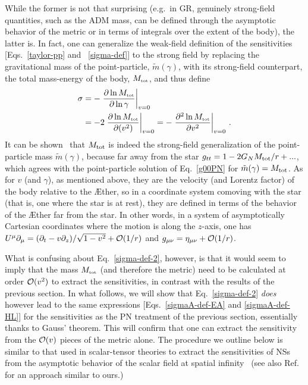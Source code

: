 \documentclass[prd,aps,twocolumn,nofootinbib,showpacs,superscriptaddress]{revtex4-1}
\newcommand{\nn}{\nonumber}
\newcommand{\tot}{{\mbox{\tiny tot}}}
\begin{document}
While the former is not that surprising (e.g.~in GR, genuinely strong-field quantities, such as
the ADM mass, can be defined through the asymptotic behavior of the metric or in terms of 
integrals over the extent of the body), the latter is. In fact, 
one can generalize the weak-field definition of the sensitivities 
[Eqs.~\eqref{taylor-pp} and ~\eqref{sigma-def}]
to the strong field by replacing the gravitational mass of the point-particle, $\tilde{m}(\gamma)$, with its strong-field counterpart, the 
total mass-energy of the body, $M_{\tot}$, and thus define
%
\begin{align}\label{sigma-def-2}
\sigma &=- \left.\frac{\partial \ln M_{\tot}}{\partial \ln
  \gamma}\right|_{v=0}\nn \\&=- 2 \left.\frac{\partial \ln M_{\tot}}{\partial
  (v^2)}\right|_{v=0}= - \left.\frac{\partial^2 \ln M_{\tot}}{\partial
  {v}^2}\right|_{v=0}\,.
\end{align}
It can be shown~\cite{Foster:2005fr,Eling:2005zq} that $M_{\rm tot}$ is indeed the strong-field generalization of the  point-particle mass $\tilde{m}(\gamma)$,
because far away from the star $g_{tt}= 1-2 G_N M_{\rm tot}/r+...$, which agrees with the point-particle solution of
Eq.~\eqref{g00PN} for $\tilde{m}(\gamma)=M_{\rm tot}$. As for $v$ (and $\gamma$), as mentioned above, they are the velocity (and Lorentz factor) of the body relative to the \AE ther, so in a coordinate system
comoving with the star (that is, one where the star is at rest), they are defined in terms of the behavior of
the \AE ther far from the star. 
In other words, in a system of asymptotically Cartesian coordinates where the motion is
along the $z$-axis, one has $U^{\mu}\partial_\mu=
(\partial_t-v \partial_z)/\sqrt{1-v^2} +{\cal O}(1/r)$ and
$g_{\mu\nu}=\eta_{\mu\nu}+{\cal O}(1/r)$.

What is confusing about Eq.~\eqref{sigma-def-2}, however, is that it would seem
to imply that the mass $M_{\tot}$ (and therefore the metric) need to be calculated at 
order ${\cal O}(v^2)$ to extract the sensitivities, in contrast with the results of the previous section.
%
In what follows, we will show that Eq.~\eqref{sigma-def-2} \textit{does} however lead to the same expressions [Eqs.~\eqref{sigmaA-def-EA} and \eqref{sigmaA-def-HL}]
for the sensitivities as the PN treatment of the previous section, 
essentially thanks to Gauss' theorem. This will confirm that one can extract the sensitivity from the ${\cal O}(v)$ pieces of the metric alone.
The procedure we outline below is similar to that used in scalar-tensor theories to extract the sensitivities of NSs
from the asymptotic behavior of the scalar field at spatial infinity~\cite{damour_esposito_farese}
(see also Ref.~\cite{Gralla:2013rwa} for an approach similar to ours.)
\end{document}
